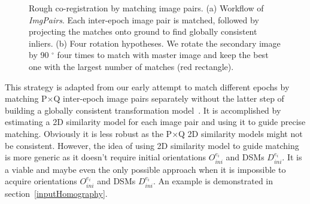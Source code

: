 \begin{figure}[htbp]
\begin{center}
{\begin{minipage}[t]{0.8\linewidth}
    \end{minipage}%
}
        \caption{Rough co-registration by matching image pairs. (a) Workflow of \textit{ImgPairs}. Each inter-epoch image pair is matched, followed by projecting the matches onto ground to find globally consistent inliers. (b) Four rotation hypotheses. We rotate the secondary image by 90 $^\circ$ four times to match with master image and keep the best one with the largest number of matches (red rectangle).}
        \label{WorkflowImgPair}
    \end{center}
\end{figure}

This strategy is adapted from our early attempt to match different epochs by matching P$\times$Q inter-epoch image pairs separately without the latter step of building a globally consistent transformation model~\cite{zhang2020guided}. It is accomplished by estimating a 2D similarity model for each image pair and using it to guide precise matching. Obviously it is less robust as the P$\times$Q 2D similarity models might not be consistent.
However, the idea of using 2D similarity model to guide matching is more generic as it doesn't require initial orientations $O_{ini}^{e_i}$ and DSMs $D_{ini}^{e_i}$. It is a viable and maybe even the only possible approach when it is impossible to acquire orientations $O_{ini}^{e_i}$ and DSMs $D_{ini}^{e_i}$. An example is demonstrated in section~\ref{inputHomography}. %




